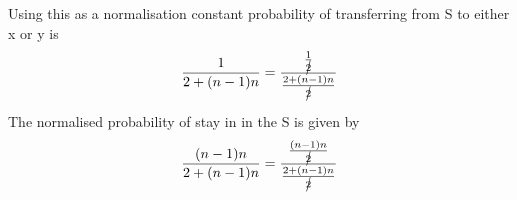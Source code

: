 Using this as a normalisation constant probability of transferring from S to either x or y is 
\begin{equation}
    \frac{1}{2+(n-1)n}=\frac{\frac{1}{\cancel{2}}}{\frac{2+(n-1)n}{\cancel{2}}}
\end{equation}

The normalised probability of stay in in the S is given by
\begin{equation}
        \frac{(n-1)n}{2+(n-1)n}=\frac{\frac{(n-1)n}{\cancel{2}}}{\frac{2+(n-1)n}{\cancel{2}}}
        \label{eq:stayinS}
\end{equation}